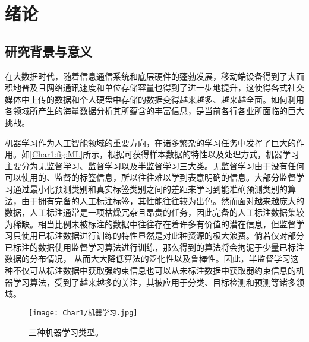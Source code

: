 \chapter{绪论}

\section{研究背景与意义}
在大数据时代，随着信息通信系统和底层硬件的蓬勃发展，移动端设备得到了大面积地普及且网络通讯速度和单位存储容量也得到了进一步地提升，这使得各式社交媒体中上传的数据和个人硬盘中存储的数据变得越来越多、越来越全面。如何利用各领域所产生的海量数据分析其所蕴含的丰富信息，是当前各行各业所面临的巨大挑战。

机器学习作为人工智能领域的重要方向，在诸多繁杂的学习任务中发挥了巨大的作用\cite{LeCun_DeepLearning_2015}。如\autoref{Char1:fig:ML}所示，根据可获得样本数据的特性以及处理方式，机器学习主要分为无监督学习、监督学习以及半监督学习三大类\cite{马毓敏_最大化_2020}。无监督学习由于没有任何可以使用的、监督的标签信息，所以往往难以学到表意明确的信息。大部分监督学习通过最小化预测类别和真实标签类别之间的差距来学习到能准确预测类别的算法，由于拥有完备的人工标注标签，其性能往往较为出色\cite{Goodfellow_ML_2016}。然而面对越来越庞大的数据，人工标注通常是一项枯燥冗杂且昂贵的任务，因此完备的人工标注数据集较为稀缺。相当比例未被标注的数据中往往存在着许多有价值的潜在信息，但监督学习只使用已标注数据进行训练的特性显然是对此种资源的极大浪费。倘若仅对部分已标注的数据使用监督学习算法进行训练，那么得到的算法将会拘泥于少量已标注数据的分布情况，
从而大大降低算法的泛化性以及鲁棒性。因此，半监督学习这种不仅可从标注数据中获取强约束信息也可以从未标注数据中获取弱约束信息的机器学习算法，受到了越来越多的关注，其被应用于分类、目标检测和预测等诸多领域\cite{Ding_Semi-overview_2017,Kiran_SemiOverView_2018,Zhou_ShortPredict_2021}。
\begin{figure}[htbp]
    \centering
    \texttt{[image: Char1/机器学习.jpg]}
    \caption{\label{Char1:fig:ML}三种机器学习类型。}
\end{figure}

